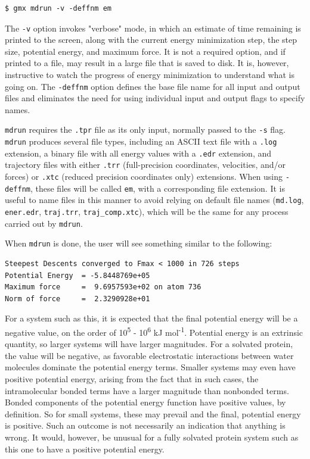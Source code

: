 \documentclass[9pt,tutorial,pubversion]{livecoms}
\begin{document}
\begin{lstlisting}
$ gmx mdrun -v -deffnm em
\end{lstlisting}

The \texttt{-v} option invokes "verbose" mode, in which an estimate of time remaining is printed to the screen, along with the current energy minimization step, the step size, potential energy, and maximum force. It is not a required option, and if printed to a file, may result in a large file that is saved to disk. It is, however, instructive to watch the progress of energy minimization to understand what is going on. The \texttt{-deffnm} option defines the base file name for all input and output files and eliminates the need for using individual input and output flags to specify names. 

\texttt{mdrun} requires the \texttt{.tpr} file as its only input, normally passed to the \texttt{-s} flag. \texttt{mdrun} produces several file types, including an ASCII text file with a \texttt{.log} extension, a binary file with all energy values with a \texttt{.edr} extension, and trajectory files with either \texttt{.trr} (full-precision coordinates, velocities, and/or forces) or \texttt{.xtc} (reduced precision coordinates only) extensions. When using \texttt{-deffnm}, these files will be called \texttt{em}, with a corresponding file extension. It is useful to name files in this manner to avoid relying on default file names (\texttt{md.log}, \texttt{ener.edr}, \texttt{traj.trr}, \texttt{traj\_comp.xtc}), which will be the same for any process carried out by \texttt{mdrun}.

When \texttt{mdrun} is done, the user will see something similar to the following:

\begin{lstlisting}[basicstyle=\footnotesize\ttfamily]
Steepest Descents converged to Fmax < 1000 in 726 steps
Potential Energy  = -5.8448769e+05
Maximum force     =  9.6957593e+02 on atom 736
Norm of force     =  2.3290928e+01
\end{lstlisting}

For a system such as this, it is expected that the final potential energy will be a negative value, on the order of 10\textsuperscript{5} - 10\textsuperscript{6} kJ mol\textsuperscript{-1}. Potential energy is an extrinsic quantity, so larger systems will have larger magnitudes. For a solvated protein, the value will be negative, as favorable electrostatic interactions between water molecules dominate the potential energy terms. Smaller systems may even have positive potential energy, arising from the fact that in such cases, the intramolecular bonded terms have a larger magnitude than nonbonded terms. Bonded components of the potential energy function have positive values, by definition. So for small systems, these may prevail and the final, potential energy is positive. Such an outcome is not necessarily an indication that anything is wrong. It would, however, be unusual for a fully solvated protein system such as this one to have a positive potential energy.
\end{document}
